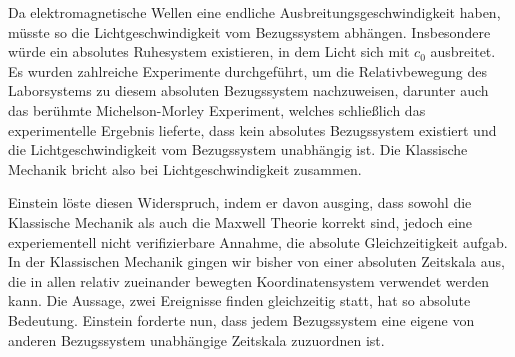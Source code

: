 Da elektromagnetische Wellen eine endliche Ausbreitungsgeschwindigkeit haben,
müsste so die Lichtgeschwindigkeit vom Bezugssystem abhängen. Insbesondere
würde ein absolutes Ruhesystem existieren, in dem Licht sich mit $c_0$
ausbreitet. Es wurden zahlreiche Experimente durchgeführt, um die
Relativbewegung des Laborsystems zu diesem absoluten Bezugssystem
nachzuweisen, darunter auch das berühmte Michelson-Morley Experiment, welches
schließlich das experimentelle Ergebnis lieferte, dass kein absolutes
Bezugssystem existiert und die Lichtgeschwindigkeit vom Bezugssystem unabhängig
ist. Die Klassische Mechanik bricht also bei Lichtgeschwindigkeit zusammen.
 
Einstein löste diesen Widerspruch, indem er davon ausging, dass sowohl die
Klassische Mechanik als auch die Maxwell Theorie korrekt sind, jedoch eine
experiementell nicht verifizierbare Annahme, die absolute Gleichzeitigkeit
aufgab. In der Klassischen Mechanik gingen wir bisher von einer absoluten
Zeitskala aus, die in allen relativ zueinander bewegten Koordinatensystem verwendet
werden kann. Die Aussage, zwei Ereignisse finden gleichzeitig statt, hat so
absolute Bedeutung. Einstein forderte nun, dass jedem Bezugssystem eine
eigene von anderen Bezugssystem unabhängige Zeitskala zuzuordnen ist.

